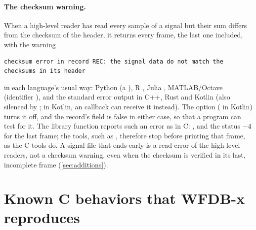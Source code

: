 \paragraph{The checksum warning.} When a high-level reader has read every
sample of a signal but their sum differs from the checksum of the header,
it returns every frame, the last one included, with the warning
\begin{lstlisting}[style=text]
checksum error in record REC: the signal data do not match the checksums in its header
\end{lstlisting}
in each language's usual way: Python  (a
), R , Julia ,
MATLAB/Octave  (identifier ), and the
standard error output in C++, Rust and Kotlin (also silenced by
; in Kotlin, an  callback can receive it
instead). The  option ( in
Kotlin) turns it off, and the record's  field is false in
either case, so that a program can test for it. The library function
 reports such an error as in C: , and the status $-4$ for the last frame; the tools, such as
, therefore stop before printing that frame, as the C tools do.
A signal file that ends early is a read error of the high-level readers,
not a checksum warning, even when the checksum is verified in its last,
incomplete frame (\cref{sec:additions}).

\section{Known C behaviors that WFDB-x reproduces}
\label{sec:known-c}


